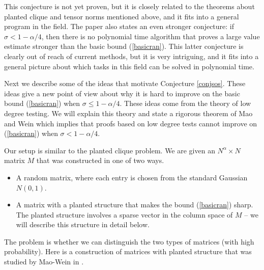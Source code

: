 \documentclass{amsart}
\begin{document}
This conjecture is not yet proven,  but it is closely related to the theorems about planted clique and tensor norms mentioned above,  and it fits into a general program in the field.   The paper \cite{DHPT} also states an even stronger conjecture: if $\sigma < 1 - \alpha / 4$,  then there is no polynomial time algorithm that proves a large value estimate stronger than the basic bound (\ref{basicran}).   This latter conjecture is clearly out of reach of current methods,  but it is very intriguing, and it fits into a general picture about which tasks in this field can be solved in polynomial time.

Next we describe some of the ideas that motivate Conjecture \ref{conjsos}.   These ideas give a new point of view about why it is hard to improve on the basic bound (\ref{basicran}) when $\sigma \le 1 - \alpha/4$.   These ideas come from the theory of low degree testing.   We will explain this theory and state a rigorous theorem of Mao and Wein \cite{MW} which implies that proofs based on low degree tests cannot improve on (\ref{basicran}) when $\sigma < 1 - \alpha/4$.  

Our setup is similar to the planted clique problem.   We are given an $N^\alpha \times N$ matrix $M$ that was constructed in one of two ways.

\begin{itemize}

\item A random matrix,  where each entry is chosen from the standard Gaussian $N(0,1)$.

\item A matrix with a planted structure that makes the bound (\ref{basicran}) sharp.   The planted structure involves a sparse vector in the column space of $M$ -- we will describe this structure in detail below.

\end{itemize}

The problem is whether we can distinguish the two types of matrices (with high probability).   Here is a construction of matrices with planted structure that was studied by Mao-Wein in \cite{MW}.
\end{document}

